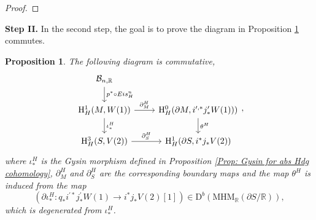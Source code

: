 \documentclass[11pt, a4paper]{amsart}
\theoremstyle{plain}
\newtheorem{proposition}[theorem]{Proposition}
\theoremstyle{definition}
\numberwithin{equation}{section}
\def\RR{\mathbb{R}}
\begin{document}
\begin{proof}
\end{proof}

\vspace{10pt}

\noindent \textbf{Step II.} In the second step, the goal is to prove the diagram in Proposition \ref{Prop: Hodge commutative diagram} commutes. 

\begin{proposition}
\label{Prop: Hodge commutative diagram}
The following diagram is commutative,
\[
    \begin{tikzcd}
         \mathcal{B}_{n, \RR} \ar[d, "p^{*}\circ Eis_{H}^{n}"] & \\
        \mathrm{H}^{1}_{H}(M,W(1)) \ar[r, "\partial_{M}^{H}"] \ar[d, "{\iota_{*}^{H}}"] & \mathrm{H}^{0}_{H}(\partial{M}, i^{\prime, *}j^{\prime}_{*}W(1))) \ar[d, "{\theta^{H}}"] \\
        \mathrm{H}^{3}_{H}(S, V(2)) \ar[r, "\partial_{S}^{H}"] & \mathrm{H}^{1}_{H}(\partial{S}, i^{*}j_{*}V(2))
    \end{tikzcd}, 
\]
where $\iota_{*}^{H}$ is the Gysin morphism defined in Proposition \ref{Prop: Gysin for abs Hdg cohomology}, $\partial_{M}^{H}$ and $\partial_{S}^{H}$ are the corresponding boundary maps and the map $\theta^{H}$ is induced from the map
\begin{equation}
\label{eq: Hodge theta in derived category.}
    (\partial \iota_{*}^{H} \colon q_{*}i^{\prime*}j^{\prime}_{*}W(1) \rightarrow i^{*}j_{*}V(2)[1]) \in \mathrm{D}^{b}(\mathrm{MHM}_{\RR}(\partial S/\RR)),
\end{equation}
which is degenerated from $\iota^{H}_{*}$. 
    
\end{proposition}
\end{document}
